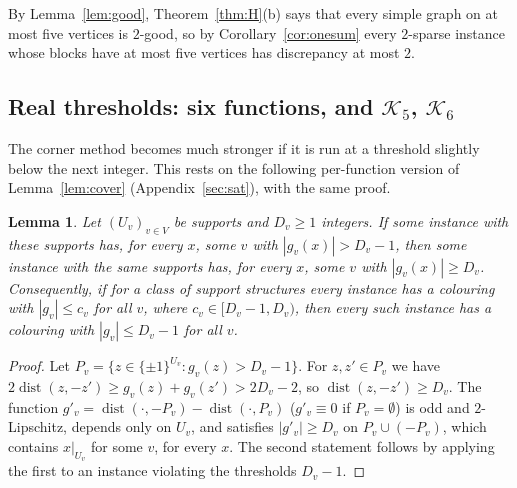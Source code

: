 \documentclass[11pt,letterpaper]{article}
\newtheorem{lemma}[theorem]{Lemma}
\theoremstyle{definition}
\newcommand{\cube}[1]{\{\pm1\}^{#1}}
\DeclareMathOperator{\dist}{dist}
\begin{document}
By Lemma~\ref{lem:good}, Theorem~\ref{thm:H}(b) says that every simple graph on at most five vertices
is $2$-good, so by Corollary~\ref{cor:onesum} every $2$-sparse instance whose blocks have at most five
vertices has discrepancy at most $2$.

\subsection{Real thresholds: six functions, and \texorpdfstring{$\mathcal{K}_5$}{K5}, \texorpdfstring{$\mathcal{K}_6$}{K6}}\label{sec:realc}

The corner method becomes much stronger if it is run at a threshold slightly below the next
integer. This rests on the following per-function version of Lemma~\ref{lem:cover} (Appendix~\ref{sec:sat}),
with the same proof.

\begin{lemma}\label{lem:integrality}
Let $(U_v)_{v\in V}$ be supports and $D_v\ge1$ integers. If some instance with these supports has, for
every $x$, some $v$ with $|g_v(x)|>D_v-1$, then some instance with the same supports has, for every
$x$, some $v$ with $|g_v(x)|\ge D_v$. Consequently, if for a class of support structures every instance
has a colouring with $|g_v|\le c_v$ for all $v$, where $c_v\in[D_v-1,D_v)$, then every such instance
has a colouring with $|g_v|\le D_v-1$ for all $v$.
\end{lemma}

\begin{proof}
Let $P_v=\{z\in\cube{U_v}:g_v(z)>D_v-1\}$. For $z,z'\in P_v$ we have
$2\dist(z,-z')\ge g_v(z)+g_v(z')>2D_v-2$, so $\dist(z,-z')\ge D_v$. The function
$g'_v=\dist(\cdot,-P_v)-\dist(\cdot,P_v)$ ($g'_v\equiv0$ if $P_v=\emptyset$) is odd and $2$-Lipschitz,
depends only on $U_v$, and satisfies $|g'_v|\ge D_v$ on $P_v\cup(-P_v)$, which contains $x|_{U_v}$ for
some $v$, for every $x$. The second statement follows by applying the first to an instance violating
the thresholds $D_v-1$.
\end{proof}
\end{document}

